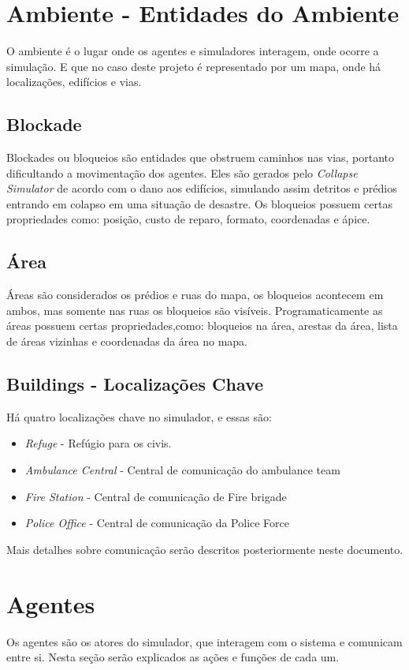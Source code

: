 \documentclass[conference]{IEEEtran}
\begin{document}
\section{Ambiente - Entidades do Ambiente}
O ambiente é o lugar onde os agentes e simuladores interagem, onde ocorre a simulação. E que no caso deste projeto é representado por um mapa, onde há localizações, edifícios e vias.
\subsection{Blockade}
Blockades ou bloqueios são entidades que obstruem caminhos nas vias, portanto dificultando a movimentação dos agentes.
Eles são gerados pelo \textit{Collapse Simulator} de acordo com o dano aos edifícios, simulando assim detritos e prédios entrando em colapso em uma situação de desastre. Os bloqueios possuem certas propriedades como: posição, custo de reparo, formato, coordenadas e ápice.

\subsection{Área}
Áreas são considerados os prédios e ruas do mapa, os bloqueios acontecem em ambos, mas somente nas ruas os bloqueios são visíveis. Programaticamente as áreas possuem certas propriedades,como: bloqueios na área, arestas da área, lista de áreas vizinhas e coordenadas da área no mapa.
\subsection{Buildings - Localizações Chave}
Há quatro localizações chave no simulador, e essas são:
\begin{itemize}
\item \textit {Refuge} - Refúgio para os civis.
\item \textit {Ambulance Central} - Central de comunicação do ambulance team
\item \textit {Fire Station} - Central de comunicação de Fire brigade
\item \textit {Police Office} - Central de comunicação da Police Force
\end{itemize}
Mais detalhes sobre comunicação serão descritos posteriormente neste documento.


\section{Agentes}
Os agentes são os atores do simulador, que interagem com o sistema e comunicam entre si. Nesta seção serão explicados as ações e funções de cada um.
\end{document}
